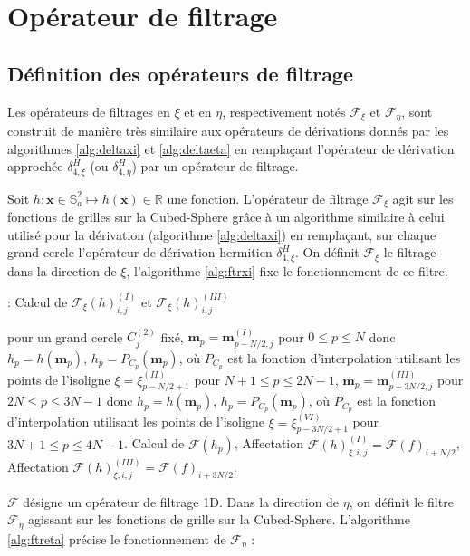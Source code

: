 \section{Opérateur de filtrage}

\subsection{Définition des opérateurs de filtrage}

Les opérateurs de filtrages en $\xi$ et en $\eta$, respectivement notés $\mathcal{F}_{\xi}$ et $\mathcal{F}_{\eta}$, sont construit de manière très similaire aux opérateurs de dérivations donnés par les algorithmes \ref{alg:deltaxi} et \ref{alg:deltaeta} en remplaçant l'opérateur de dérivation approchée $\delta^H_{4,\xi}$ (ou $\delta^H_{4,\eta}$) par un opérateur de filtrage.

Soit $h : \mathbf{x} \in \mathbb{S}_a^2 \mapsto h(\mathbf{x}) \in \mathbb{R}$ une fonction. L'opérateur de filtrage $\mathcal{F}_{\xi}$ agit sur les fonctions de grilles sur la Cubed-Sphere grâce à un algorithme similaire à celui utilisé pour la dérivation (algorithme  \ref{alg:deltaxi}) en remplaçant, sur chaque grand cercle l'opérateur de dérivation hermitien $\delta_{4,\xi}^H$. On définit $\mathcal{F}_{\xi}$ le filtrage dans la direction de $\xi$, l'algorithme \ref{alg:ftrxi} fixe le fonctionnement de ce filtre.

\begin{center}
\begin{minipage}[H]{12cm}
  \begin{algorithm}[H]
    \caption{: Calcul de $\mathcal{F}_{\xi}(h)_{i,j}^{(I)}$ et $\mathcal{F}_{\xi}(h)_{i,j}^{(III)}$}\label{alg:ftrxi}
    \begin{algorithmic}[1]
    \State pour un grand cercle $C_j^{(2)}$ fixé,
             \State  $\mathbf{m}_p = \mathbf{m}_{p-N/2,j}^{(I)}$ pour $0  \leq p \leq N$ donc $h_p = h(\mathbf{m}_p)$,
             \State $h_p = P_{C_p}(\mathbf{m}_p)$, où $P_{C_p}$ est la fonction d'interpolation utilisant les points de l'isoligne $\xi = \xi^{(II)}_{p-N/2+1}$ pour $N+1 \leq p \leq 2N-1$,
             \State  $\mathbf{m}_p = \mathbf{m}_{p-3N/2,j}^{(III)}$ pour $2N  \leq p \leq 3N-1$ donc $h_p = h(\mathbf{m}_p)$,
             \State $h_p = P_{C_p}(\mathbf{m}_p)$, où $P_{C_p}$ est la fonction d'interpolation utilisant les points de l'isoligne $\xi = \xi^{(VI)}_{p-3N/2+1}$ pour $3N+1 \leq p \leq 4N-1$.
            \EndFor
    \State Calcul de $\mathcal{F}(h_p)$,
    \State Affectation $\mathcal{F}(h)_{\xi,i,j}^{(I)} = \mathcal{F}(f)_{i+N/2}$,
    \State Affectation $\mathcal{F}(h)_{\xi,i,j}^{(III)} = \mathcal{F}(f)_{i+3N/2}$.
    \EndFor
    \end{algorithmic}
    \end{algorithm}
\end{minipage}
\end{center}
$\mathcal{F}$ désigne un opérateur de filtrage 1D. Dans la direction de $\eta$, on définit le filtre $\mathcal{F}_{\eta}$ agissant sur les fonctions de grille sur la Cubed-Sphere. L'algorithme \ref{alg:ftreta} précise le fonctionnement de $\mathcal{F}_{\eta}$ :

